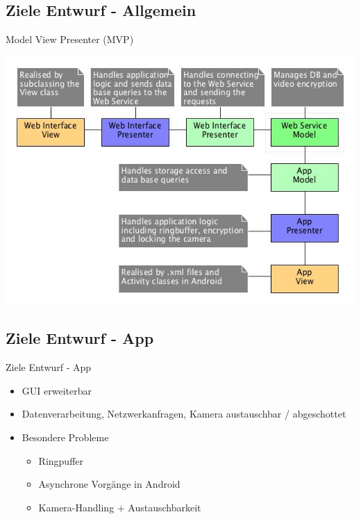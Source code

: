 \documentclass[19pt]{beamer}
\begin{document}
\subsection{Ziele Entwurf - Allgemein}
\begin{frame}{Model View Presenter (MVP)}
\begin{center}
\includegraphics[scale=0.3]{resources/overview_mvp.jpg}
\end{center}
\end{frame}

\subsection{Ziele Entwurf - App}
\begin{frame}{Ziele Entwurf - App}
	\begin{itemize}
		\item GUI erweiterbar
		\item Datenverarbeitung, Netzwerkanfragen, Kamera austauschbar / abgeschottet
		\item Besondere Probleme
		\begin{itemize}
			\item Ringpuffer
			\item Asynchrone Vorgänge in Android
			\item Kamera-Handling + Austauschbarkeit
		\end{itemize}
	\end{itemize}
\end{frame}
\end{document}
